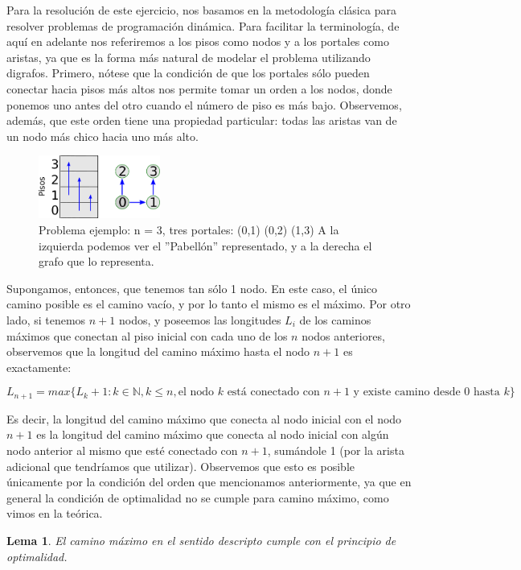 \documentclass{article}
\newtheorem{lemma}{Lema}[theorem]
\theoremstyle{definition}
\theoremstyle{remark}
\begin{document}
Para la resolución de este ejercicio, nos basamos en la metodología clásica para resolver problemas de programación dinámica. Para facilitar la terminología, de aquí en adelante nos referiremos a los pisos como nodos y a los portales como aristas, ya que es la forma más natural de modelar el problema utilizando digrafos. Primero, nótese que la condición de que los portales sólo pueden conectar hacia pisos más altos nos permite tomar un orden a los nodos, donde ponemos uno antes del otro cuando el número de piso es más bajo. Observemos, además, que este orden tiene una propiedad particular: todas las aristas van de un nodo más chico hacia uno más alto.

\begin{figure}
    \centering
        \includegraphics[width=4cm]{images/ej1/example.png}

    
    \caption{Problema ejemplo: n = 3, tres portales: (0,1) (0,2) (1,3)
    A la izquierda podemos ver el ''Pabellón'' representado, y a la derecha el grafo que lo representa.\label{grf:ex1-example}}
\end{figure}

Supongamos, entonces, que tenemos tan sólo 1 nodo. En este caso, el único camino posible es el camino vacío, y por lo tanto el mismo es el máximo. Por otro lado, si tenemos $n + 1$ nodos, y poseemos las longitudes $L_i$ de los caminos máximos que conectan al piso inicial con cada uno de los $n$ nodos anteriores, observemos que la longitud del camino máximo hasta el nodo $n + 1$ es exactamente:

$$L_{n + 1} = max\{L_k + 1 : k \in \mathbb{N}, k \leq n, \text{el nodo } k \text{ está conectado con } n + 1 \text{ y existe camino desde } 0 \text{ hasta } k\}$$

Es decir, la longitud del camino máximo que conecta al nodo inicial con el nodo $n + 1$ es la longitud del camino máximo que conecta al nodo inicial con algún nodo anterior al mismo que esté conectado con $n + 1$, sumándole 1 (por la arista adicional que tendríamos que utilizar). Observemos que esto es posible únicamente por la condición del orden que mencionamos anteriormente, ya que en general la condición de optimalidad no se cumple para camino máximo, como vimos en la teórica.

\begin{lemma}
El camino máximo en el sentido descripto cumple con el principio de optimalidad.
\end{lemma}
\end{document}
